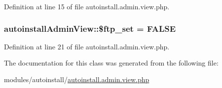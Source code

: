 Definition at line 15 of file autoinstall.\+admin.\+view.\+php.

\subsubsection[{\texorpdfstring{\$ftp\+\_\+set}{$ftp_set}}]{\setlength{\rightskip}{0pt plus 5cm}autoinstall\+Admin\+View\+::\$ftp\+\_\+set = F\+A\+L\+SE}\hypertarget{classautoinstallAdminView_a2b4389cba13f2fc27c57adb8b597a56f}{}\label{classautoinstallAdminView_a2b4389cba13f2fc27c57adb8b597a56f}


Definition at line 21 of file autoinstall.\+admin.\+view.\+php.



The documentation for this class was generated from the following file\+:\begin{DoxyCompactItemize}
\item 
modules/autoinstall/\hyperlink{autoinstall_8admin_8view_8php}{autoinstall.\+admin.\+view.\+php}\end{DoxyCompactItemize}
